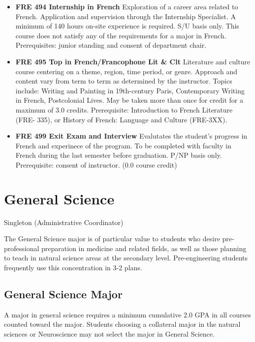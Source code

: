 \documentclass[
  letterpaper,
]{scrbook}
\begin{document}
\begin{itemize}
\item
  \textbf{FRE 494 Internship in French} Exploration of a career area
  related to French. Application and supervision through the Internship
  Specialist. A minimum of 140 hours on-site experience is required. S/U
  basis only. This course does not satisfy any of the requirements for a
  major in French. Prerequisites: junior standing and consent of
  department chair.
\item
  \textbf{FRE 495 Top in French/Francophone Lit \& Clt} Literature and
  culture course centering on a theme, region, time period, or genre.
  Approach and content vary from term to term as determined by the
  instructor. Topics include: Writing and Painting in 19th-century
  Paris, Contemporary Writing in French, Postcolonial Lives. May be
  taken more than once for credit for a maximum of 3.0 credits.
  Prerequisite: Introduction to French Literature (FRE- 335), or History
  of French: Language and Culture (FRE-3XX).
\item
  \textbf{FRE 499 Exit Exam and Interview} Evalutates the student's
  progress in French and experinece of the program. To be completed with
  faculty in French during the last semester before graduation. P/NP
  basis only. Prerequisite: consent of instructor. (0.0 course credit)
\end{itemize}

\hypertarget{sec-general-science}{%
\section{General Science}\label{sec-general-science}}

Singleton (Administrative Coordinator)

The General Science major is of particular value to students who desire
pre-professional preparation in medicine and related fields, as well as
those planning to teach in natural science areas at the secondary level.
Pre-engineering students frequently use this concentration in 3-2 plans.

\hypertarget{general-science-major}{%
\subsection{General Science Major}\label{general-science-major}}

A major in general science requires a minimum cumulative 2.0 GPA in all
courses counted toward the major. Students choosing a collateral major
in the natural sciences or Neuroscience may not select the major in
General Science.
\end{document}
